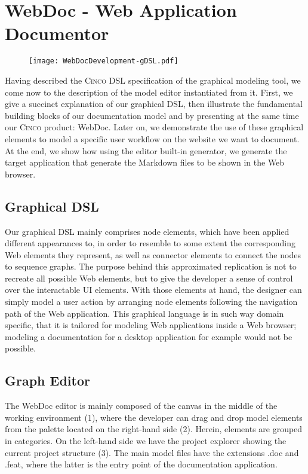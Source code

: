 \chapter{WebDoc - Web Application Documentor}\label{ch:CP}

\begin{figure}[h]
    \centering
    \texttt{[image: WebDocDevelopment-gDSL.pdf]}
    \label{fig:webDoc}
\end{figure}

Having described the \textsc{Cinco} DSL specification of the graphical modeling tool, we come now to the description of the model editor instantiated from it. First, we give a succinct explanation of our graphical DSL, then illustrate the fundamental building blocks of our documentation model and by presenting at the same time our \textsc{Cinco} product: WebDoc. Later on, we demonstrate the use of these graphical elements to model a specific user workflow on the website we want to document. At the end, we show how using the editor built-in generator, we generate the target application that generate the Markdown files to be shown in the Web browser.

\section{Graphical DSL}\label{sec:gDSL}

Our graphical DSL mainly comprises node elements, which have been applied different appearances to, in order to resemble to some extent the corresponding Web elements they represent, as well as connector elements to connect the nodes to sequence graphs. The purpose behind this approximated replication is not to recreate all possible Web elements, but to give the developer a sense of control over the interactable UI elements. With those elements at hand, the designer can simply model a user action by arranging node elements following the navigation path of the Web application. This graphical language is in such way domain specific, that it is tailored for modeling Web applications inside a Web browser; modeling a documentation for a desktop application for example would not be possible.

\section{Graph Editor}\label{sec:graphEditor}

The WebDoc editor is mainly composed of the canvas in the middle of the working environment (1), where the developer can drag and drop model elements from the palette located on the right-hand side (2). Herein, elements are grouped in categories. On the left-hand side we have the project explorer showing the current project structure (3). The main model files have the extensions .doc and .feat, where the latter is the entry point of the documentation application.

